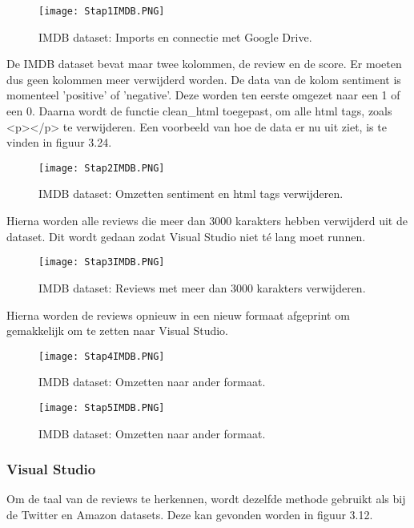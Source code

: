 \begin{figure}[!htbp]
    \texttt{[image: Stap1IMDB.PNG]}
    \caption{\label{stap1imdb}IMDB dataset: Imports en connectie met Google Drive.}
\end{figure}
\FloatBarrier 

De IMDB dataset bevat maar twee kolommen, de review en de score. Er moeten dus geen kolommen meer verwijderd worden. De data van de kolom sentiment is momenteel 'positive' of 'negative'. Deze worden ten eerste omgezet naar een 1 of een 0. Daarna wordt de functie clean\_html toegepast, om alle html tags, zoals <p></p> te verwijderen. Een voorbeeld van hoe de data er nu uit ziet, is te vinden in figuur 3.24.

\begin{figure}[!htbp]
    \texttt{[image: Stap2IMDB.PNG]}
    \caption{\label{stap2imdb}IMDB dataset: Omzetten sentiment en html tags verwijderen.}
\end{figure}
\FloatBarrier 

Hierna worden alle reviews die meer dan 3000 karakters hebben verwijderd uit de dataset. Dit wordt gedaan zodat Visual Studio niet té lang moet runnen. 

\begin{figure}[!htbp]
    \texttt{[image: Stap3IMDB.PNG]}
    \caption{\label{stap3imdb}IMDB dataset: Reviews met meer dan 3000 karakters verwijderen.}
\end{figure}
\FloatBarrier

Hierna worden de reviews opnieuw in een nieuw formaat afgeprint om gemakkelijk om te zetten naar Visual Studio.

\begin{figure}[!htbp]
    \texttt{[image: Stap4IMDB.PNG]}
    \caption{\label{stap4imdb}IMDB dataset: Omzetten naar ander formaat.}
\end{figure}
\FloatBarrier

\begin{figure}[!htbp]
    \texttt{[image: Stap5IMDB.PNG]}
    \caption{\label{stap5imdb}IMDB dataset: Omzetten naar ander formaat.}
\end{figure}
\FloatBarrier



\subsubsection{Visual Studio}
\label{imdbdatasetvisualstudioazure}
Om de taal van de reviews te herkennen, wordt dezelfde methode gebruikt als bij de Twitter en Amazon datasets. Deze kan gevonden worden in figuur 3.12.

